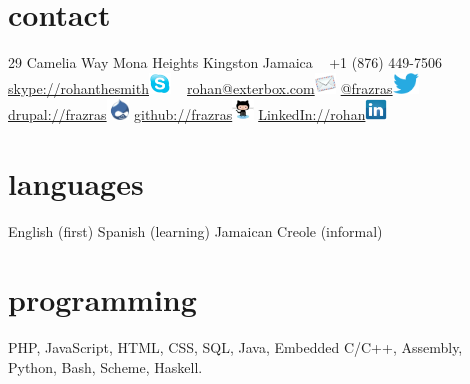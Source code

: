 \documentclass[]{friggeri-cv} %
\begin{document}


\begin{aside} %
\section{contact}
29 Camelia Way
Mona Heights
Kingston
Jamaica
~
+1 (876) 449-7506
\href {skype://rohanthesmith}{skype://rohanthesmith}\includegraphics[height=16pt]{skype.png}
~
\href{mailto:rohan@exterbox.com}{rohan@exterbox.com}\includegraphics[height=16pt]{email.png}
\href{http://twitter.com/frazras}{@frazras}\includegraphics[height=16pt]{twitter.eps}
\href{http://drupal.org/user/34622}{drupal://frazras}\includegraphics[height=16pt]{druplicon.png}
\href {https://github.com/frazras}{github://frazras}\includegraphics[height=16pt]{octocat.png}
\href {http://jm.linkedin.com/in/rohansmith}{LinkedIn://rohan}\includegraphics[height=16pt]{linkedin.png}
\section{languages}
English (first)
Spanish (learning)
Jamaican Creole (informal)
\section{programming}
 PHP,  JavaScript, HTML, CSS, SQL, Java, Embedded C/C++, Assembly, Python, Bash, Scheme, Haskell.
\end{aside}
\end{document}
